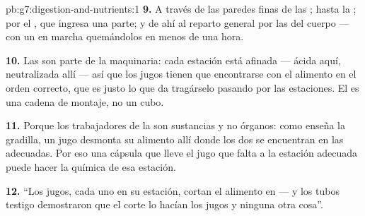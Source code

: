 \begin{solution}{pb:g7:digestion-and-nutrients:1}
\textbf{9.} A través de las paredes finas de las ; hasta la
; por el , que ingresa una parte; y de ahí al reparto
general por las  del cuerpo --- con un  en marcha
quemándolos en menos de una hora.

\textbf{10.} Las  son parte de la maquinaria: cada estación
está afinada --- ácida aquí, neutralizada allí --- así que los jugos
tienen que encontrarse con el alimento en el orden correcto, que es
justo lo que da tragárselo pasando por las estaciones. El  es una cadena de montaje, no un cubo.

\textbf{11.} Porque los trabajadores de la  son sustancias y
no órganos: como enseña la gradilla, un jugo desmonta su alimento allí
donde los dos se encuentran en las  adecuadas. Por eso una
cápsula que lleve el jugo que falta a la estación adecuada puede hacer
la química de esa estación.

\textbf{12.} ``Los jugos, cada uno en su estación, cortan el alimento
en  --- y los tubos testigo demostraron que el corte lo
hacían los jugos y ninguna otra cosa''.
\end{solution}
